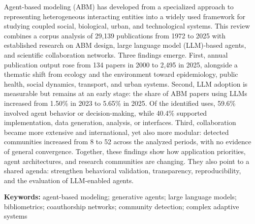 Agent-based modeling (ABM) has developed from a specialized approach to representing heterogeneous interacting entities into a widely used framework for studying coupled social, biological, urban, and technological systems. This review combines a corpus analysis of 29,139 publications from 1972 to 2025 with established research on ABM design, large language model (LLM)-based agents, and scientific collaboration networks. Three findings emerge. First, annual publication output rose from 134 papers in 2000 to 2,495 in 2025, alongside a thematic shift from ecology and the environment toward epidemiology, public health, social dynamics, transport, and urban systems. Second, LLM adoption is measurable but remains at an early stage: the share of ABM papers using LLMs increased from 1.50\% in 2023 to 5.65\% in 2025. Of the identified uses, 59.6\% involved agent behavior or decision-making, while 40.4\% supported implementation, data generation, analysis, or interfaces. Third, collaboration became more extensive and international, yet also more modular: detected communities increased from 8 to 52 across the analyzed periods, with no evidence of general convergence. Together, these findings show how application priorities, agent architectures, and research communities are changing. They also point to a shared agenda: strengthen behavioral validation, transparency, reproducibility, and the evaluation of LLM-enabled agents.

\par\smallskip\noindent\textbf{Keywords:} agent-based modeling; generative agents; large language models; bibliometrics; coauthorship networks; community detection; complex adaptive systems